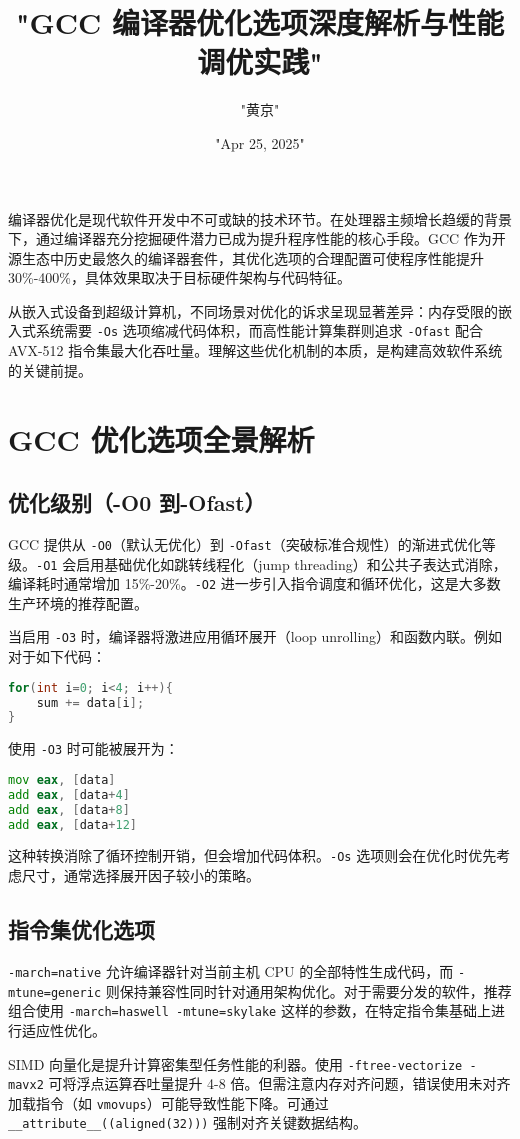 \title{"GCC 编译器优化选项深度解析与性能调优实践"}
\author{"黄京"}
\date{"Apr 25, 2025"}
\maketitle
编译器优化是现代软件开发中不可或缺的技术环节。在处理器主频增长趋缓的背景下，通过编译器充分挖掘硬件潜力已成为提升程序性能的核心手段。GCC 作为开源生态中历史最悠久的编译器套件，其优化选项的合理配置可使程序性能提升 30\%{}-400\%{}，具体效果取决于目标硬件架构与代码特征。\par
从嵌入式设备到超级计算机，不同场景对优化的诉求呈现显著差异：内存受限的嵌入式系统需要 \texttt{-Os} 选项缩减代码体积，而高性能计算集群则追求 \texttt{-Ofast} 配合 AVX-512 指令集最大化吞吐量。理解这些优化机制的本质，是构建高效软件系统的关键前提。\par
\chapter{GCC 优化选项全景解析}
\section{优化级别（-O0 到-Ofast）}
GCC 提供从 \texttt{-O0}（默认无优化）到 \texttt{-Ofast}（突破标准合规性）的渐进式优化等级。\texttt{-O1} 会启用基础优化如跳转线程化（jump threading）和公共子表达式消除，编译耗时通常增加 15\%{}-20\%{}。\texttt{-O2} 进一步引入指令调度和循环优化，这是大多数生产环境的推荐配置。\par
当启用 \texttt{-O3} 时，编译器将激进应用循环展开（loop unrolling）和函数内联。例如对于如下代码：\par
\begin{lstlisting}[language=c]
for(int i=0; i<4; i++){
    sum += data[i];
}
\end{lstlisting}
使用 \texttt{-O3} 时可能被展开为：\par
\begin{lstlisting}[language=asm]
mov eax, [data]
add eax, [data+4]
add eax, [data+8]
add eax, [data+12]
\end{lstlisting}
这种转换消除了循环控制开销，但会增加代码体积。\texttt{-Os} 选项则会在优化时优先考虑尺寸，通常选择展开因子较小的策略。\par
\section{指令集优化选项}
\texttt{-march=native} 允许编译器针对当前主机 CPU 的全部特性生成代码，而 \texttt{-mtune=generic} 则保持兼容性同时针对通用架构优化。对于需要分发的软件，推荐组合使用 \texttt{-march=haswell -mtune=skylake} 这样的参数，在特定指令集基础上进行适应性优化。\par
SIMD 向量化是提升计算密集型任务性能的利器。使用 \texttt{-ftree-vectorize -mavx2} 可将浮点运算吞吐量提升 4-8 倍。但需注意内存对齐问题，错误使用未对齐加载指令（如 \texttt{vmovups}）可能导致性能下降。可通过 \texttt{\_{}\_{}attribute\_{}\_{}((aligned(32)))} 强制对齐关键数据结构。\par
